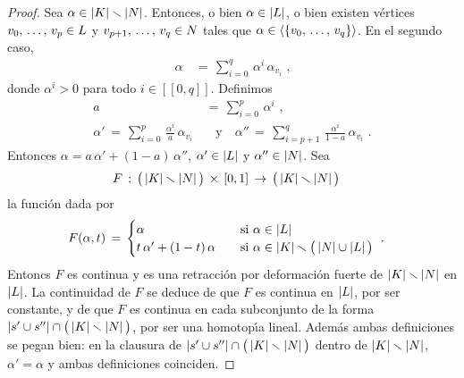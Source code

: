 \begin{proof}
	Sea $\alpha\in\left|K\right|\smallsetminus\left|N\right|$. Entonces, o bien
	$\alpha\in\left|L\right|$, o bien existen v\'{e}rtices
	$\lista[0]{v}{p}\in L$ y $\lista[p+1]{v}{q}\in N$ tales que
	$\alpha\in\simpinterior{\{\lista[0]{v}{q}\}}$. En el segundo caso,
	\begin{align*}
		\alpha & \,=\,\sum_{i=0}^{q}\,\alpha^{i}\,\alpha_{v_{i}}
		\text{ ,}
	\end{align*}
	donde $\alpha^{i}>0$ para todo $i\in[\![0,q]\!]$. Definimos
	\begin{align*}
		a & \,=\,\sum_{i=0}^{p}\,\alpha^{i}\text{ ,} \\
		\alpha' \,=\,\sum_{i=0}^{p}\,
			\frac{\alpha^{i}}{a}\,\alpha_{v_{i}}
			& \quad\text{y}\quad
		\alpha'' \,=\,\sum_{i=p+1}^{q}\,
			\frac{\alpha^{i}}{1-a}\,\alpha_{v_{i}}
		\text{ .}
	\end{align*}
	Entonces $\alpha = a\,\alpha'+(1-a)\,\alpha''$, $\alpha' \in\left|L\right|$
	y $\alpha''\in\left|N\right|$. Sea
	\begin{align*}
		F & \,:\,\big(\left|K\right|\smallsetminus\left|N\right|\big)\,\times\,\left[0,1\right]
			\,\rightarrow\,\big(\left|K\right|\smallsetminus\left|N\right|\big)
	\end{align*}
	la funci\'{o}n dada por
	\begin{align*}
		F(\alpha,t) & \,=\,
			\begin{cases}
				\alpha & \quad\text{si }\alpha\in\left|L\right| \\
				t\,\alpha'+(1-t)\,\alpha &
					\quad\text{si }\alpha\in
					\left|K\right|\smallsetminus\big(
						\left|N\right|\cup\left|L\right|\big)
			\end{cases}
		\text{ .}
	\end{align*}
	Entoncs $F$ es continua y es una retracci\'{o}n por deformaci\'{o}n
	fuerte de $\left|K\right|\smallsetminus\left|N\right|$ en $\left|L\right|$. La continuidad de
	$F$ se deduce de que $F$ es continua en $\left|L\right|$, por ser constante,
	y de que $F$ es continua en cada subconjunto de la forma
	$\left|s'\cup s''\right|\cap\big(\left|K\right|\smallsetminus\left|N\right|\big)$, por ser
	una homotop\'{\i}a lineal. Adem\'{a}s ambas definiciones se pegan
	bien: en la clausura de
	\begin{math}
		\left|s'\cup s''\right|\cap\big(\left|K\right|\smallsetminus\left|N\right|\big)
	\end{math}
	dentro de $\left|K\right|\smallsetminus\left|N\right|$, $\alpha'=\alpha$ y ambas
	definiciones coinciden.
\end{proof}
